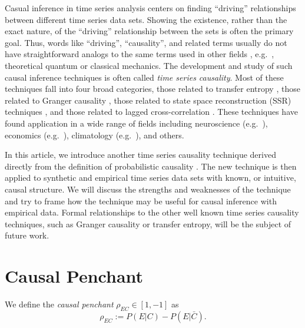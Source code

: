 \documentclass[twocolumn,aps,pre,groupedaddress]{revtex4-1}
\begin{document}
Casual inference in time series analysis centers on finding ``driving'' relationships between different time series data sets.  Showing the existence, rather than the exact nature, of the ``driving'' relationship between the sets is often the primary goal.  Thus, words like ``driving'', ``causality'', and related terms usually do not have straightforward analogs to the same terms used in other fields \cite{Granger1980,liu2012,Roberts1985}, e.g.\ , theoretical quantum or classical mechanics.  The development and study of such causal inference techniques is often called {\em time series causality}.  Most of these techniques fall into four broad categories, those related to transfer entropy \cite{Schreiber2000}, those related to Granger causality \cite{granger1969}, those related to state space reconstruction (SSR) techniques \cite{Sugihara2012}, and those related to lagged cross-correlation \cite{box2013,pascual2014}.  These techniques have found application in a wide range of fields including neuroscience (e.g.\ \cite{Kaminski2001}), economics (e.g.\ \cite{dufour1998,dufour2006}), climatology (e.g.\ \cite{mosedale2006}), and others.  

In this article, we introduce another time series causality technique derived directly from the definition of probabilistic causality \cite{Suppes1970}.  The new technique is then applied to synthetic and empirical time series data sets with known, or intuitive, causal structure.  We will discuss the strengths and weaknesses of the technique and try to frame how the technique may be useful for causal inference with empirical data.  Formal relationships to the other well known time series causality techniques, such as Granger causality or transfer entropy, will be the subject of future work.

\section{Causal Penchant}
We define the {\em causal penchant} $\rho_{EC}\in\left[1,-1\right]$ as
\begin{equation}
\label{eq:pen}
\rho_{EC} := P\left(E|C\right) - P\left(E|\bar{C}\right).
\end{equation}
\end{document}

